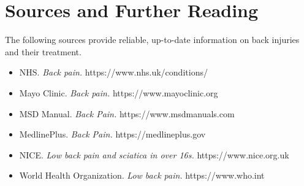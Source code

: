 \section*{Sources and Further Reading}
The following sources provide reliable, up-to-date information on back injuries and their treatment.
\begin{itemize}
    \item NHS. \textit{Back pain.} https://www.nhs.uk/conditions/
    \item Mayo Clinic. \textit{Back pain.} https://www.mayoclinic.org
    \item MSD Manual. \textit{Back Pain.} https://www.msdmanuals.com
    \item MedlinePlus. \textit{Back Pain.} https://medlineplus.gov
    \item NICE. \textit{Low back pain and sciatica in over 16s.} https://www.nice.org.uk
    \item World Health Organization. \textit{Low back pain.} https://www.who.int
\end{itemize}
